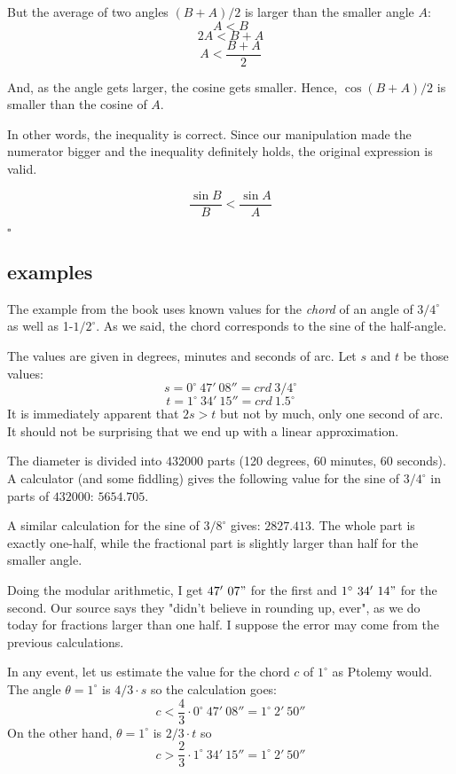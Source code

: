 \documentclass[11pt, oneside]{article}
\begin{document}
But the average of two angles $(B + A)/2$ is larger than the smaller angle $A$:
\[ A < B \]
\[ 2A < B + A \]
\[ A < \frac{B + A}{2} \]

And, as the angle gets larger, the cosine gets smaller.  Hence, $\cos (B + A)/2$ is smaller than the cosine of $A$.

In other words, the inequality is correct.  Since our manipulation made the numerator bigger and the inequality definitely holds, the original expression is valid.

\[ \frac{\sin B}{B} < \frac{\sin A}{A} \]

$\square$

\subsection*{examples}

The example from the book uses known values for the \emph{chord} of an angle of $3/4^{\circ}$ as well as 1-$1/2^{\circ}$.  As we said, the chord corresponds to the sine of the half-angle.

The values are given in degrees, minutes and seconds of arc.  Let $s$ and $t$ be those values:
\[ s = 0^{\circ}\ 47'\ 08'' = crd \ 3/4^{\circ} \]
\[ t = 1^{\circ}\ 34'\ 15'' = crd \ 1.5^{\circ} \]
It is immediately apparent that $2s > t$ but not by much, only one second of arc.  It should not be surprising that we end up with a linear approximation.

The diameter is divided into $432000$ parts (120 degrees, 60 minutes,  60 seconds).  A calculator (and some fiddling) gives the following value for the sine of $3/4^{\circ}$ in parts of $432000$:  $5654.705$.

A similar calculation for the sine of $3/8^{\circ}$ gives:  $2827.413$.  The whole part is exactly one-half, while the fractional part is slightly larger than half for the smaller angle.

Doing the modular arithmetic, I get $47' \ 07"$ for the first and $1^{\circ} \ 34' \ 14"$ for the second.  Our source says they "didn't believe in rounding up, ever", as we do today for fractions larger than one half.  I suppose the error may come from the previous calculations.

In any event, let us estimate the value for the chord $c$ of $1^{\circ}$ as Ptolemy would.  The angle $\theta = 1^{\circ}$ is $4/3 \cdot s$ so the calculation goes:
\[ c < \frac{4}{3} \cdot 0^{\circ}\ 47'\ 08'' = 1^{\circ}\ 2'\ 50'' \]
On the other hand, $\theta = 1^{\circ}$ is $2/3 \cdot t$ so 
\[ c > \frac{2}{3} \cdot 1^{\circ}\ 34'\ 15'' = 1^{\circ}\ 2'\ 50'' \]
\end{document}

